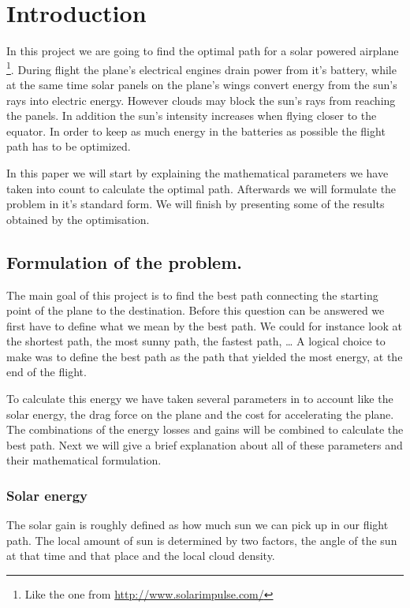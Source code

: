 \section{Introduction}
\setcounter{page}{1}


In this project we are going to find the optimal path for a solar powered airplane \footnote{Like the one from \url{http://www.solarimpulse.com/}}. During flight the plane's electrical engines drain power from it's battery, while at the same time solar panels on the plane's wings convert energy from the sun's rays into electric energy. However clouds may block the sun's rays from reaching the panels. In addition the sun's intensity increases when flying closer to the equator. In order to keep as much energy in the batteries as possible the flight path has to be optimized.

In this paper we will start by explaining the mathematical parameters we have taken into count to calculate the optimal path.
Afterwards we will formulate the problem in it's standard form.
We will finish by presenting some of the results obtained by the optimisation.


\subsection{Formulation of the problem.}

The main goal of this project is to find the best path connecting the starting point of the plane to the destination.
Before this question can be answered we first have to define what we mean by the best path.
We could for instance look at the shortest path, the most sunny path, the fastest path, \dots 
A logical choice to make was to define the best path as the path that yielded the most energy, at the end of the flight.

To calculate this energy we have taken several parameters in to account like the solar energy, the drag force on the plane and the cost for accelerating the plane.
The combinations of the energy losses and gains will be combined to calculate the best path.
Next we will give a brief explanation about all of these parameters and their mathematical formulation.

\subsubsection{Solar energy}

The solar gain is roughly defined as how much sun we can pick up in our flight path.
The local amount of sun is determined by two factors, the angle of the sun at that time and that place and the local cloud density.

